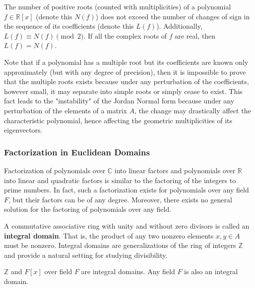 \documentclass{article}
\begin{document}
      \begin{theorem}
        The number of positive roots (counted with multiplicities) of a polynomial $f \in \mathbb{R}[x]$ (denote this $N(f)$) does not exceed the number of changes of sign in the sequence of its coefficients (denote this $L(f)$). Additionally, $L(f) \equiv N(f) \pmod{2}$. If all the complex roots of $f$ are real, then $L(f) = N(f)$. 
      \end{theorem}

      Note that if a polynomial has a multiple root but its coefficients are known only approximately (but with any degree of precision), then it is impossible to prove that the multiple roots exists because under any perturbation of the coefficients, however small, it may separate into simple roots or simply cease to exist. This fact leads to the "instability" of the Jordan Normal form because under any perturbation of the elements of a matrix $A$, the change may drastically affect the characteristic polynomial, hence affecting the geometric multiplicities of its eigenvectors. 

    \subsubsection{Factorization in Euclidean Domains}

      Factorization of polynomials over $\mathbb{C}$ into linear factors and polynomials over $\mathbb{R}$ into linear and quadratic factors is similar to the factoring of the integers to prime numbers. In fact, such a factorization exists for polynomials over any field $F$, but their factors can be of any degree. Moreover, there exists no general solution for the factoring of polynomials over any field. 

      \begin{definition}
        A commutative associative ring with unity and without zero divisors is called an \textbf{integral domain}. That is, the product of any two nonzero elements $x, y \in A$ must be nonzero. Integral domains are generalizations of the ring of integers $\mathbb{Z}$ and provide a natural setting for studying divisibility. 
      \end{definition}

      \begin{example}
        $\mathbb{Z}$ and $F[x]$ over field $F$ are integral domains. Any field $F$ is also an integral domain. 
      \end{example}
\end{document}
